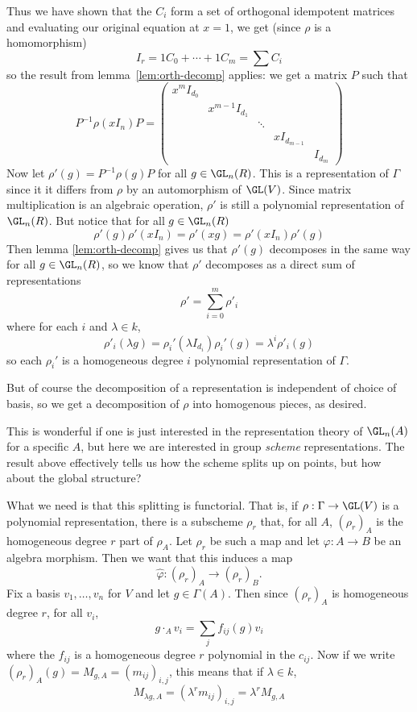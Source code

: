 \documentclass[12pt]{article}
\begin{document}
\begin{prf}
	Thus we have shown that the $C_i$ form a set of orthogonal idempotent matrices and evaluating our original equation at $x=1$,
	we get (since $\rho$ is a homomorphism)
	\[I_r=1C_0+\cdots+1C_m=\sum C_i\]
	so the result from lemma~\ref{lem:orth-decomp} applies: we get a matrix $P$ such that 
	\[P^{-1}\rho(xI_n)P=\begin{pmatrix}
		x^mI_{d_0} & & & &\\
		& x^{m-1}I_{d_1} & & &\\
		& & \ddots & &\\
		& & & xI_{d_{m-1}} & \\
		& & & & I_{d_m}
	\end{pmatrix}\]
	Now let $\rho'(g)=P^{-1}\rho (g)P$ for all $g\in\GL_n(R)$. This is a representation of $\Gamma$ since it it differs from $\rho$ by 
	an automorphism of $\GL(V)$. Since matrix multiplication is an algebraic operation, $\rho'$ is still a polynomial representation of $\GL_n(R)$. 
	But notice that for all $g\in\GL_n(R)$
	\[\rho'(g)\rho'(xI_n)=\rho'(xg)=\rho'(xI_n)\rho'(g)\]
	Then lemma \ref{lem:orth-decomp} gives us that $\rho'(g)$ decomposes in the same way for all $g\in \GL_n(R)$, so 
	we know that $\rho'$ decomposes as a direct sum of representations 
	\[\rho'=\sum_{i=0}^m \rho'_i\]
	where for each $i$ and $\lambda\in k$,
	\[\rho'_i(\lambda g)=\rho_i'(\lambda I_{d_i})\rho_i'(g)=\lambda^i\rho'_i(g)\]
	so each $\rho_i'$ is a homogeneous degree $i$ polynomial representation of $\Gamma$.

	But of course the decomposition of a representation is independent of choice of basis,
	so we get a decomposition of $\rho$ into homogenous pieces, as desired.
\end{prf}

This is wonderful if one is just interested in the representation theory of $\GL_n(A)$ for a specific $A$, but 
here we are interested in group \textit{scheme} representations. The result above effectively tells us how the scheme splits 
up on points, but how about the global structure?

What we need is that this splitting is functorial. That is, if $\rho:\Gamma\to\GL(V)$ is a polynomial representation, there is a subscheme $\rho_r$
that, for all $A$, $(\rho_r)_A$ is the homogeneous degree $r$ part of $\rho_A$. Let $\rho_r$ be such a map and let $\varphi:A\to B$ be an 
algebra morphism. Then we want that this induces a map
\[\hat\varphi:(\rho_r)_A\to (\rho_r)_B.\]
Fix a basis $v_1,\dots,v_n$ for $V$ and let $g\in \Gamma(A)$. Then since $(\rho_r)_A$ is homogeneous degree $r$, for all $v_i$,
\[g\cdot_A v_i=\sum_j f_{ij}(g)v_i\]
where the $f_{ij}$ is a homogeneous degree $r$ polynomial in the $c_{ij}$. Now if we write $(\rho_r)_A(g)=M_{g,A}=(m_{ij})_{i,j}$, this means that 
if $\lambda\in k$,
\[M_{\lambda g, A}=(\lambda^rm_{ij})_{i,j}=\lambda^rM_{g,A}\]
\end{document}
